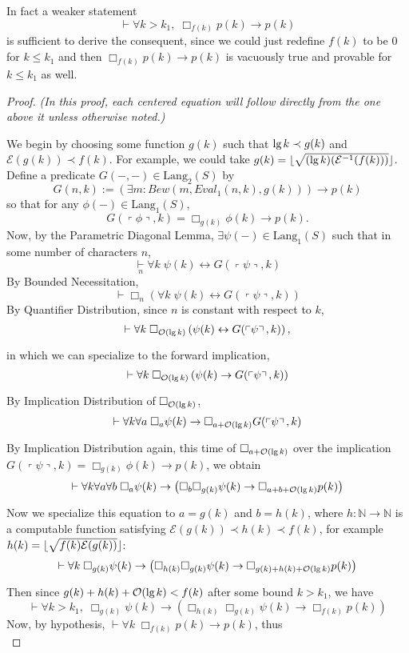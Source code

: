 \documentclass[onecolumn]{miri-tech-article}
\DeclarePairedDelimiter\floor{\lfloor}{\rfloor}
\numberwithin{equation}{section}
\newcommand{\eqn}[1]{\begin{equation}#1\end{equation}}
\theoremstyle{definition}
\newcommand{\NN}{\mathbb{N}}
\newcommand{\Ee}{\mathcal{E}}
\newcommand{\Oo}{\mathcal{O}}
\newcommand{\proves}[1]{\underset{#1}{\vdash}}
\newcommand{\bx}[1]{\Box_{#1}}
\newcommand{\Lang}{\mathrm{Lang}}
\renewcommand{\implies}{\rightarrow}
\renewcommand{\to}{\rightarrow}
\renewcommand{\iff}{\leftrightarrow}
\newcommand{\qquote}[1]{\left\ulcorner #1 \right\urcorner}
\renewcommand{\lg}{\mathrm{lg\hspace{0.3ex}}}
\renewcommand{\-}{^{-1}}
\begin{document}
 In fact a weaker statement
$$\proves{} \forall k>k_1,\; \bx{f(k)}p(k) \implies p(k)$$
is sufficient to derive the consequent, since we could just redefine $f(k)$ to be $0$ for $k\leq k_1$ and then $\bx{f(k)}p(k) \implies p(k)$ is vacuously true and provable for $k \leq k_1$ as well.

\begin{proof}
{\em (In this proof, each centered equation will follow directly from the one above it unless otherwise noted.)}

We begin by choosing some function $g(k)$ such that $\lg k \prec g(k)$ and $\Ee(g(k)) \prec f(k)$.  For example, we could take $g(k) = \floor{\sqrt{(\lg k)(\Ee\- (f(k)))}}$.  Define a predicate $G(-,-)\in\Lang_2(S)$ by
$$G(n,k) := \left(\exists m : Bew(m,Eval_1(n,k),g(k))\right) \implies p(k)$$
so that for any $\phi(-)\in\Lang_1(S)$,
%
$$G(\qquote\phi,k) = \bx{g(k)}\phi(k) \implies p(k).$$
%
Now, by the Parametric Diagonal Lemma, $\exists \psi(-)\in\Lang_1(S)$ such that in some number of characters $n$,
\eqn{\label{eqn1}
\proves{n} \forall k \; \psi(k) \iff G(\qquote\psi,k)
}
By Bounded Necessitation,
$$\proves{} \bx{n} \left(\forall k \; \psi(k) \iff G(\qquote\psi,k)\right)$$
By Quantifier Distribution, since $n$ is constant with respect to $k$,
$$\proves{} \forall k \; \bx{\Oo(\lg k)} \left(\psi(k) \iff G(\qquote\psi,k)\right),$$
in which we can specialize to the forward implication,
$$\proves{} \forall k \; \bx{\Oo(\lg k)} \left(\psi(k) \implies G(\qquote\psi,k)\right)$$
By Implication Distribution of $\bx{\Oo(\lg k)}$,
$$\proves{} \forall k \forall a \; \bx{a}\psi(k) \implies \bx{a+\Oo(\lg k)}G(\qquote\psi,k)$$
By Implication Distribution again, this time of $\bx{a+\Oo(\lg k)}$ over the implication $G(\qquote\psi,k) = \bx{g(k)}\phi(k) \implies p(k)$, we obtain
$$\proves{} \forall k \forall a \forall b \; \bx{a}\psi(k) \implies 
\left(\bx{b}\bx{g(k)}\psi(k) \implies \bx{a+b+\Oo(\lg k)}p(k)\right)$$
Now we specialize this equation to $a=g(k)$ and $b=h(k)$, where $h:\NN\to\NN$ is a computable function satisfying $\Ee (g(k))\prec h(k)\prec f(k)$, for example $h(k) = \floor{\sqrt{f(k)\Ee (g(k))}}$:
$$\proves{} \forall k \; \bx{g(k)} \psi(k) \implies 
\left(\bx{h(k)}\bx{g(k)}\psi(k) \implies \bx{g(k)+h(k)+\Oo(\lg k)} p(k)\right)$$
Then since $g(k)+h(k)+\Oo(\lg k) < f(k)$ after some bound $k > k_1$, we have
$$\proves{} \forall k>k_1, \; \bx{g(k)}\psi(k) \implies \left(\bx{h(k)}\bx{g(k)}\psi(k) \implies \bx{f(k)} p(k)\right)$$
Now, by hypothesis, $\proves{} \forall k\; \bx{f(k)}p(k)\implies p(k)$, thus
\eqn{\label{eqn9}
}
\end{proof}
\end{document}
